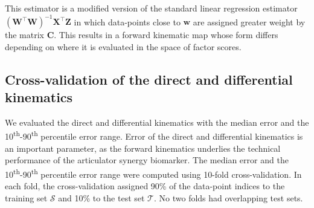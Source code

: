 \documentclass[reprint]{JASAnew}\usepackage[]{graphicx}\usepackage[]{color}
\begin{document}
This estimator is a modified version of the standard linear regression estimator $\left( \mathbf{W}^\intercal \mathbf{W} \right)^{-1} \mathbf{X}^\intercal \mathbf{Z}$ in which data-points close to $\mathbf{w}$ are assigned greater weight by the matrix $\mathbf{C}$. This results in a forward kinematic map whose form differs depending on where it is evaluated in the space of factor scores.










\subsection{Cross-validation of the direct and differential kinematics}
\label{subsec:crossval}

We evaluated the direct and differential kinematics with the median error and the 10\textsuperscript{th}-90\textsuperscript{th} percentile error range.
%
Error of the direct and differential kinematics is an important parameter, as the forward kinematics underlies the technical performance of the articulator synergy biomarker.
%
The median error and the 10\textsuperscript{th}-90\textsuperscript{th} percentile error range were computed using \num{10}-fold cross-validation. 
%
In each fold, the cross-validation assigned 90\% of the data-point indices to the training set $\mathcal{S}$ and 10\% to the test set $\mathcal{T}$.
%
No two folds had overlapping test sets. 
\end{document}
